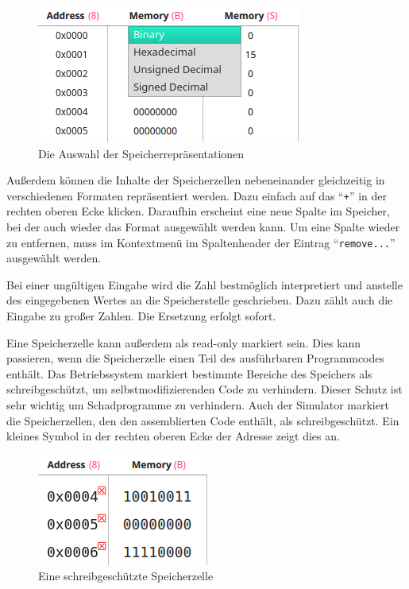 \begin{figure}[ht]
	\centering
  \includegraphics[scale=1]{Images/Memory_Representation}
	\caption{Die Auswahl der Speicherrepräsentationen}
	\label{Memory_Respresentations}
\end{figure}

Außerdem können die Inhalte der Speicherzellen nebeneinander gleichzeitig in
verschiedenen Formaten repräsentiert werden. Dazu einfach auf das ``\texttt{+}''
in der rechten oberen Ecke klicken. Daraufhin erscheint eine neue Spalte im
Speicher, bei der auch wieder das Format ausgewählt werden kann. Um eine Spalte
wieder zu entfernen, muss im Kontextmenü im Spaltenheader der Eintrag
``\texttt{remove...}'' ausgewählt werden.

\begin{warningblock}
Bei einer ungültigen Eingabe wird die Zahl bestmöglich interpretiert und
anstelle des eingegebenen Wertes an die Speicherstelle geschrieben. Dazu zählt
auch die Eingabe zu großer Zahlen. Die Ersetzung erfolgt sofort.
\end{warningblock}

Eine Speicherzelle kann außerdem als read-only markiert sein. 
Dies kann passieren, wenn die Speicherzelle einen Teil des ausführbaren 
Programmcodes enthält. 
Das Betriebssystem markiert bestimmte Bereiche des Speichers als 
schreibgeschützt, um selbstmodifizierenden Code zu verhindern.
Dieser Schutz ist sehr wichtig um Schadprogramme zu verhindern.
Auch der Simulator markiert die Speicherzellen, den den assemblierten Code
enthält, als schreibgeschützt. Ein kleines Symbol in der rechten oberen Ecke
der Adresse zeigt dies an.

\begin{figure}[ht]
	\centering
  \includegraphics[scale=1]{Images/Memory_writeprotected}
	\caption{Eine schreibgeschützte Speicherzelle}
	\label{Memory_writeprotected}
\end{figure}


